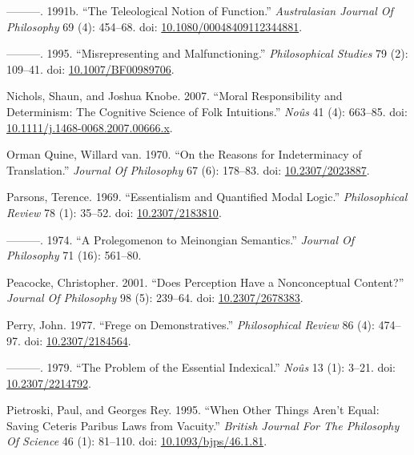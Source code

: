 \documentclass[
  10pt,
  letterpaper,
  DIV=11,
  numbers=noendperiod,
  twoside]{scrartcl}
\newlength{\cslhangindent}
\newenvironment{CSLReferences}[2] %
 {\begin{list}{}{%
  \setlength{\itemindent}{0pt}
  \setlength{\leftmargin}{0pt}
  \setlength{\parsep}{0pt}
  \ifodd #1
   \setlength{\leftmargin}{\cslhangindent}
   \setlength{\itemindent}{-1\cslhangindent}
  \fi
  \setlength{\itemsep}{#2\baselineskip}}}
 {\end{list}}
\begin{document}
\begin{CSLReferences}{1}{0}
---------. 1991b. {``The Teleological Notion of Function.''}
\emph{Australasian Journal Of Philosophy} 69 (4): 454--68. doi:
\href{https://doi.org/10.1080/00048409112344881}{10.1080/00048409112344881}.

---------. 1995. {``Misrepresenting and Malfunctioning.''}
\emph{Philosophical Studies} 79 (2): 109--41. doi:
\href{https://doi.org/10.1007/BF00989706}{10.1007/BF00989706}.

Nichols, Shaun, and Joshua Knobe. 2007. {``Moral Responsibility and
Determinism: The Cognitive Science of Folk Intuitions.''} \emph{Noûs} 41
(4): 663--85. doi:
\href{https://doi.org/10.1111/j.1468-0068.2007.00666.x}{10.1111/j.1468-0068.2007.00666.x}.

Orman Quine, Willard van. 1970. {``On the Reasons for Indeterminacy of
Translation.''} \emph{Journal Of Philosophy} 67 (6): 178--83. doi:
\href{https://doi.org/10.2307/2023887}{10.2307/2023887}.

Parsons, Terence. 1969. {``Essentialism and Quantified Modal Logic.''}
\emph{Philosophical Review} 78 (1): 35--52. doi:
\href{https://doi.org/10.2307/2183810}{10.2307/2183810}.

---------. 1974. {``A Prolegomenon to Meinongian Semantics.''}
\emph{Journal Of Philosophy} 71 (16): 561--80.

Peacocke, Christopher. 2001. {``Does Perception Have a Nonconceptual
Content?''} \emph{Journal Of Philosophy} 98 (5): 239--64. doi:
\href{https://doi.org/10.2307/2678383}{10.2307/2678383}.

Perry, John. 1977. {``Frege on Demonstratives.''} \emph{Philosophical
Review} 86 (4): 474--97. doi:
\href{https://doi.org/10.2307/2184564}{10.2307/2184564}.

---------. 1979. {``The Problem of the Essential Indexical.''}
\emph{Noûs} 13 (1): 3--21. doi:
\href{https://doi.org/10.2307/2214792}{10.2307/2214792}.

Pietroski, Paul, and Georges Rey. 1995. {``When Other Things Aren't
Equal: Saving Ceteris Paribus Laws from Vacuity.''} \emph{British
Journal For The Philosophy Of Science} 46 (1): 81--110. doi:
\href{https://doi.org/10.1093/bjps/46.1.81}{10.1093/bjps/46.1.81}.


\end{CSLReferences}
\end{document}
